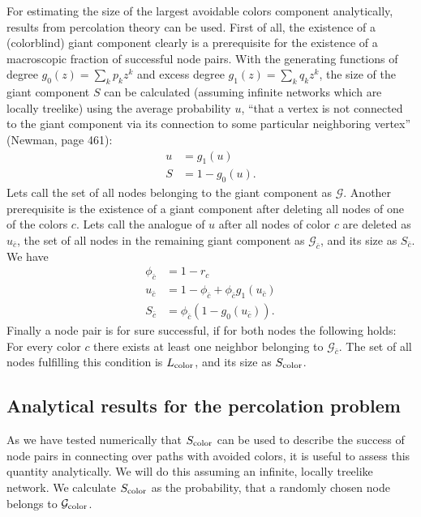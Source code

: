 \documentclass[aps, pre, onecolumn, a4paper, floatfix]{revtex4}
\begin{document}
%
For estimating the size of the largest avoidable colors component analytically, results from percolation 
theory can be used. First of all, the existence of a (colorblind) giant component clearly is a 
prerequisite for the existence of a macroscopic fraction of successful node pairs. With the 
generating functions of degree $g_0(z)=\sum_k p_k z^k$ and excess degree 
$g_1(z)=\sum_k q_k z^k$, the size of the giant component $S$ can be calculated (assuming infinite
networks which are locally treelike) using 
the average probability $u$, ``that a vertex is not connected to the giant component 
via its connection to some particular neighboring vertex'' (Newman, page 461): 
\begin{align}
u &= g_1(u)\\
S &= 1 - g_0(u).\label{eq:gc}
\end{align}
Lets call the set of all nodes belonging to the giant component as ${\mathcal G}$. 
Another prerequisite is the existence of a giant component after deleting all nodes of one 
of the colors $c$. Lets call the analogue of $u$ after all nodes of color $c$ are 
deleted as $u_{\bar c}$, the set of all nodes in the remaining giant component as 
${\mathcal G}_{\bar c}$, and its size as $S_{\bar c}$. 
We have 
\begin{align}
\phi_{\bar c} &= 1-r_c\\
u_{\bar c} &= 1-\phi_{\bar c} + \phi_{\bar c} g_1(u_{\bar c})\label{eq:u_c}\\
S_{\bar c} &= \phi_{\bar c} (1-g_0(u_{\bar c})).
\end{align}
Finally a node pair is for sure successful, if for both nodes the following 
holds: For every color $c$ there exists at least one neighbor belonging to 
${\mathcal G}_{\bar c}$. The set of all nodes fulfilling this 
condition is $L_{\rm color}$, and its size as $S_{\rm color}$. 



\subsection{Analytical results for the percolation problem}

As we have tested numerically that $S_{\rm color}$ can be used to describe the success of node 
pairs in connecting over paths with avoided colors, it is useful to assess this quantity 
analytically. We will do this assuming an infinite, locally treelike network. 
We calculate $S_{\rm color}$ as the probability, that a randomly chosen node belongs to 
${\mathcal G}_{\rm color}$. 
\end{document}
